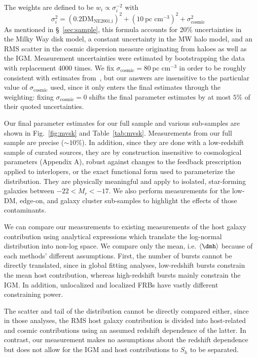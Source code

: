 The weights are defined to be $w_i \propto \sigma_i^{-2}$ with
\begin{equation} 
\sigma_i^2 = (0.2\text{DM}_\textrm{NE2001,i})^2 + (10~\text{pc cm}^{-3})^2 + \sigma_\textrm{cosmic}^{2}\label{eq:err_budget}
\end{equation} 
As mentioned in \S~\ref{sec:sample}, this formula accounts for 20\% uncertainties in the Milky Way disk model, a constant uncertainty in the MW halo model, and an RMS scatter in the cosmic dispersion measure originating from haloes as well as the IGM. Measurement uncertainties were estimated by bootstrapping the data with replacement 4000 times. We fix $\sigma_\textrm{cosmic} = 80~\text{pc cm}^{-3}$ in order to be roughly consistent with estimates from~\citet{walker2024dispersion}, but our answers are insensitive to the particular value of $\sigma_\textrm{cosmic}$ used, since it only enters the final estimates through the weighting: fixing $\sigma_\textrm{cosmic} = 0$ shifts the final parameter estimates by at most $5\%$ of their quoted uncertainties. 

Our final parameter estimates for our full sample and various sub-samples are shown in Fig.~\ref{fig:mvsk} and Table~\ref{tab:mvsk}. Measurements from our full sample are precise ($\sim 10\%$). In addition, since they are done with a low-redshift sample of curated sources, they are by construction insensitive to cosmological parameters (Appendix A), robust against changes to the feedback prescription applied to interlopers, or the exact functional form used to parameterize the distribution. They are physically meaningful and apply to isolated, star-forming galaxies between $-22 < M_r < -17$. We also perform measurements for the low-DM, edge-on, and galaxy cluster sub-samples to highlight the effects of those contaminants. 

We can compare our measurements to existing measurements of the host galaxy contribution \citep{james2021z,shin2023inferring,connor2024gas} using analytical expressions which translate the log-normal distribution into non-log space. We compare only the mean, i.e. $\langle \dmh\rangle$ because of each methods' different assumptions. First, the number of bursts cannot be directly translated, since in global fitting analyses, low-redshift bursts constrain the mean host contribution, whereas high-redshift bursts mainly constrain the IGM. In addition, unlocalized and localized FRBs have vastly different constraining power.

The scatter and tail of the distribution cannot be directly compared either, since in those analyses, the RMS host galaxy contribution is divided into host-related and cosmic contributions using an assumed redshift dependence of the latter. In contrast, our measurement makes no assumptions about the redshift dependence but does not allow for the IGM and host contributions to $S_h$ to be separated.

